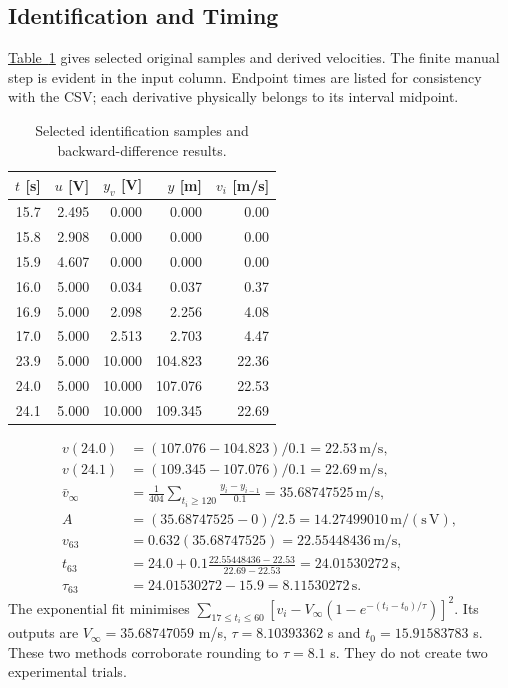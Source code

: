 \documentclass[12pt,a4paper]{article}
\numberwithin{equation}{section}
\newcommand{\unit}[1]{\,\mathrm{#1}}
\newcommand{\Tref}[1]{\hyperref[#1]{Table~\ref*{#1}}}
\newcommand{\thead}{\rowcolor{AngelBlue!28}}
\begin{document}
\subsection{Identification and Timing}
\Tref{tab:rawsamples} gives selected original samples and derived velocities. The finite manual step is evident in the input column. Endpoint times are listed for consistency with the CSV; each derivative physically belongs to its interval midpoint.
\begin{table}[H]\centering\small
\caption{Selected identification samples and backward-difference results.}\label{tab:rawsamples}
\begin{tabular}{rrrrr}\toprule\thead
$t$ [s] & $u$ [V] & $y_v$ [V] & $y$ [m] & $v_i$ [m/s]\\\midrule
15.7 & 2.495 & 0.000 & 0.000 & 0.00\\
15.8 & 2.908 & 0.000 & 0.000 & 0.00\\
15.9 & 4.607 & 0.000 & 0.000 & 0.00\\
16.0 & 5.000 & 0.034 & 0.037 & 0.37\\
16.9 & 5.000 & 2.098 & 2.256 & 4.08\\
17.0 & 5.000 & 2.513 & 2.703 & 4.47\\
23.9 & 5.000 & 10.000 & 104.823 & 22.36\\
24.0 & 5.000 & 10.000 & 107.076 & 22.53\\
24.1 & 5.000 & 10.000 & 109.345 & 22.69\\\bottomrule
\end{tabular}\end{table}
\begin{align}
v(24.0)&=(107.076-104.823)/0.1=22.53\unit{m/s},\\
v(24.1)&=(109.345-107.076)/0.1=22.69\unit{m/s},\\
\bar v_\infty&=\frac1{404}\sum_{t_i\ge120}\frac{y_i-y_{i-1}}{0.1}=35.68747525\unit{m/s},\\
A&=(35.68747525-0)/2.5=14.27499010\unit{m/(s\,V)},\\
v_{63}&=0.632(35.68747525)=22.55448436\unit{m/s},\\
t_{63}&=24.0+0.1\frac{22.55448436-22.53}{22.69-22.53}=24.01530272\unit{s},\\
\tau_{63}&=24.01530272-15.9=8.11530272\unit{s}.
\end{align}
The exponential fit minimises $\sum_{17\le t_i\le60}[v_i-V_\infty(1-e^{-(t_i-t_0)/\tau})]^2$. Its outputs are $V_\infty=35.68747059$ m/s, $\tau=8.10393362$ s and $t_0=15.91583783$ s. These two methods corroborate rounding to $\tau=8.1$ s. They do not create two experimental trials.
\end{document}

